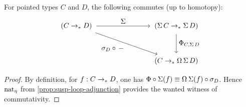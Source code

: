 \documentclass[english,a4paper]{lmcs}
\begin{document}
\begin{lem} \label{lem:adj-prop}
    For pointed types $C$ and $D$, the following commutes (up to homotopy):
    \begin{equation}
    \begin{tikzpicture}[x=5cm,y=-1.75cm,baseline=(current bounding box.center)]
    \tikzset{arrow/.style={shorten >=0.1cm,shorten <=.1cm,->}}
    \node (A) at (0,0) {$(C \to_* D)$};
    \node (D) at (1,0) {$(\susp C \to_* \susp D)$};
    \node (C) at (1,1) {$(C \to_* \Omega \susp D)$};

    \draw[arrow] (A) to node [above] {$\susp$} (D);
    \draw[arrow] (A) to node [below left] {$\sigma_D \circ \, \blank$} (C);
    \draw[arrow] (D) to node [right] {$\Phi_{C,\susp D}$} (C);
    \end{tikzpicture}
    \end{equation}
\end{lem}
\begin{proof}
  By definition, for $f:C\to_\ast D$, one has $\Phi \circ \susp (f) \jdeq
  \loopspace\null\susp(f)\circ \sigma_D$. Hence $\mathord{\mathrm{nat}}_\eta$ from
  \cref{prop:susp-loop-adjunction} provides the wanted witness of
  commutativity.
\end{proof}
\end{document}
